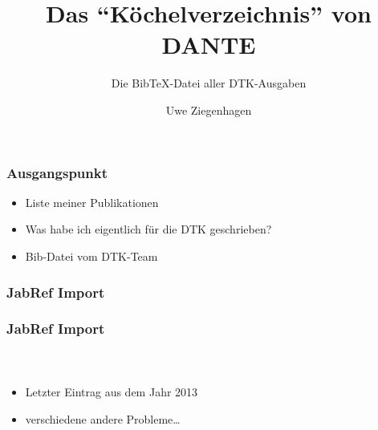\documentclass[ngerman]{beamer}
\author{Uwe Ziegenhagen}
\title{Das \enquote{Köchelverzeichnis} von DANTE}
\subtitle{Die Bib\TeX-Datei aller DTK-Ausgaben}
\begin{document}
\begin{frame}

\maketitle

\end{frame}

\begin{frame}
\frametitle{Ausgangspunkt}

\begin{itemize}
\item Liste meiner Publikationen
\item Was habe ich eigentlich für die DTK geschrieben?
\item Bib-Datei vom DTK-Team
\end{itemize}
\end{frame}

\begin{frame}
\frametitle{JabRef Import}

\begin{center}
\end{center}
\end{frame}


\begin{frame}
\frametitle{JabRef Import}
\framesubtitle{~}

\begin{itemize}
	\item Letzter Eintrag aus dem Jahr 2013
	\item verschiedene andere Probleme\ldots
\end{itemize}

\begin{center}
\end{center}

\end{frame}
\end{document}
